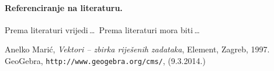 \documentclass[a4paper,12pt]{article}
\begin{document}
\paragraph{Referenciranje na literaturu.} Prema literaturi \cite{Maric} vrijedi\,\ldots \ Prema literaturi \cite{geo} mora biti\,\ldots

\begin{thebibliography}{9}
 An\dj elko Mari\'c, \emph{Vektori -- zbirka rije\v{s}enih zadataka}, Element, Zagreb, 1997.
 GeoGebra, \texttt{http://www.geogebra.org/cms/}, (9.3.2014.)
\end{thebibliography}
\end{document}
